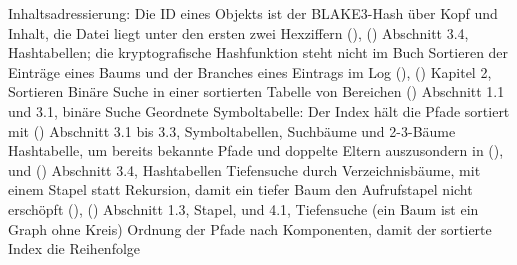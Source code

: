 \page
\setuppapersize[A4,landscape][A4,landscape]
\startplacetable[title={Algorithmen im Code von Stemma},
  reference=tab:algorithms,location=split]
\startxtable[frame=off,split=yes,option=stretch]
\startxtablehead
\startxrow[topframe=on,bottomframe=on]
 \stopxcell
{} \stopxcell
{} \stopxcell
\stopxrow
\stopxtablehead
\startxtablenext
\startxrow[topframe=on,bottomframe=on]
 \stopxcell
{} \stopxcell
{} \stopxcell
\stopxrow
\stopxtablenext
\startxrow
\startxcell Inhaltsadressierung: Die ID eines Objekts ist der BLAKE3-Hash über Kopf und Inhalt,
die Datei liegt unter den ersten zwei Hexziffern \stopxcell
\startxcell {} (),  () \stopxcell
\startxcell Abschnitt 3.4, Hashtabellen; die kryptografische Hashfunktion steht nicht im Buch
\stopxcell
\stopxrow
\startxrow
\startxcell Sortieren der Einträge eines Baums und der Branches eines Eintrags im Log \stopxcell
\startxcell {} (),
 () \stopxcell
\startxcell Kapitel 2, Sortieren \stopxcell
\stopxrow
\startxrow
\startxcell Binäre Suche in einer sortierten Tabelle von Bereichen \stopxcell
\startxcell {} () \stopxcell
\startxcell Abschnitt 1.1 und 3.1, binäre Suche \stopxcell
\stopxrow
\startxrow
\startxcell Geordnete Symboltabelle: Der Index hält die Pfade sortiert \stopxcell
\startxcell {} mit  () \stopxcell
\startxcell Abschnitt 3.1 bis 3.3, Symboltabellen, Suchbäume und 2-3-Bäume \stopxcell
\stopxrow
\startxrow
\startxcell Hashtabelle, um bereits bekannte Pfade und doppelte Eltern auszusondern \stopxcell
\startxcell {} in  (),
 und  () \stopxcell
\startxcell Abschnitt 3.4, Hashtabellen \stopxcell
\stopxrow
\startxrow
\startxcell Tiefensuche durch Verzeichnisbäume, mit einem Stapel statt Rekursion, damit ein tiefer
Baum den Aufrufstapel nicht erschöpft \stopxcell
\startxcell {} (),  () \stopxcell
\startxcell Abschnitt 1.3, Stapel, und 4.1, Tiefensuche (ein Baum ist ein Graph ohne
Kreis) \stopxcell
\stopxrow
\startxrow
\startxcell Ordnung der Pfade nach Komponenten, damit der sortierte Index die Reihenfolge
